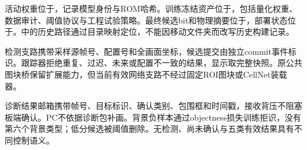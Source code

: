 活动权重位于，记录模型身份与ROM哈希。训练冻结资产位于，包括量化权重、数据审计、阈值协议与工程试验策略。最终候选bit和物理摘要位于，部署状态位于。中的历史路径通过目录映射定位，不能因移动文件夹而改写历史构建记录。\cite{layout,twosource}

检测支路携带采样源帧号、配置号和全画面坐标，候选提交由独立commit事件标识。跟踪器拒绝重复、过迟、未来或配置不一致的结果，显示取完整快照。原公共图块桥保留扩展能力，但当前有效网络支路不经过固定ROI图块或CellNet装载器。

诊断结果邮箱携带帧号、目标标识、确认类别、包围框和时间戳，接收背压不阻塞板端确认。PC不依据诊断包补画。背景负样本通过objectness损失训练拒识，没有第六个背景类型；低分候选被阈值删除。无检测、尚未确认与五类有效结果具有不同控制语义。\cite{interface,yolortl}
